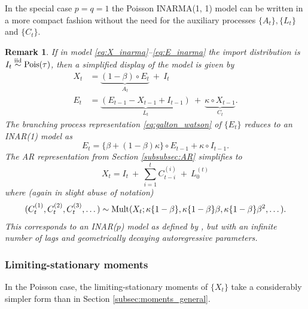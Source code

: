 \documentclass{article}
\newtheorem{remark}{Remark}
\begin{document}
In the special case $p = q = 1$ the Poisson INARMA(1, 1) model can be written in a more compact fashion without the need for the auxiliary processes $\{A_t\}, \{L_t\}$ and $\{C_t\}$.%
\begin{remark}
\label{remark:inarma11}
If in model \eqref{eq:X_inarma}--\eqref{eq:E_inarma} the import distribution is $I_t \stackrel{\textnormal{iid}}{\sim} \textnormal{Pois}(\tau)$, then a simplified display of the model is given by
\begin{align}
X_t & = \underbrace{(1 - \beta) \circ E_t}_{A_t} \ + \ I_t \label{eq:inarma_poisson_simple_X}\\
E_t & = \underbrace{(E_{t - 1} - X_{t - 1} + I_{t - 1})}_{L_t} \ + \ \underbrace{\kappa \circ X_{t - 1}}_{C_t}\label{eq:inarma_poisson_simple_E}.
\end{align}
The branching process representation \eqref{eq:galton_watson} of $\{E_t\}$ reduces to an INAR(1) model as
\begin{equation}
E_t = \{\beta + (1 - \beta)\kappa\} \circ E_{t - 1} + \kappa \circ I_{t - 1}.\label{eq:E_INAR}
\end{equation}
The AR representation from Section \ref{subsubsec:AR} simplifies to
$$
X_t = I_t \ + \ \sum_{i  = 1}^t C_{t - i}^{(i)} \ + \ L_0^{(t)}
$$
where (again in slight abuse of notation)
\begin{align}
(C_t^{(1)}, C_t^{(2)}, C_t^{(3)}, \dots) \sim \textnormal{Mult}(X_{t}; \kappa\{1- \beta\}, \kappa\{1 - \beta\}\beta, \kappa\{1 - \beta\}\beta^2, \dots).\label{eq:ar_inf}
\end{align}
This corresponds to an INAR($p$) model as defined by \cite{Alzaid1990}, but with an infinite number of lags and geometrically decaying autoregressive parameters.
\end{remark}






\subsubsection{Limiting-stationary moments}

In the Poisson case, the limiting-stationary moments of $\{X_t\}$ take a considerably simpler form than in Section \ref{subsec:moments_general}.
\end{document}
